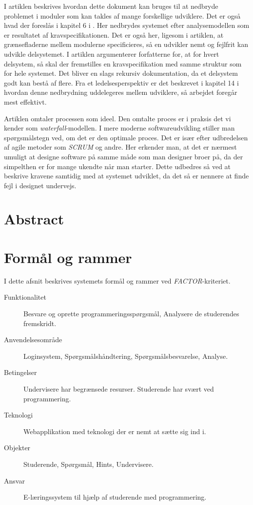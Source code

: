 \documentclass[12pt]{article}
\begin{document}
I artiklen beskrives hvordan dette dokument kan bruges til at nedbryde problemet i moduler som kan takles af mange forskellige udviklere. Det er også hvad der foreslås i kapitel 6 i \cite{OOSE}. Her nedbrydes systemet efter analysemodellen som er resultatet af kravspecifikationen. Det er også her, ligesom i artiklen, at grænsefladerne mellem modulerne specificieres, så en udvikler nemt og fejlfrit kan udvikle delsystemet. I artiklen argumenterer forfatterne for, at for hvert delsystem, så skal der fremstilles en kravspecifikation med samme struktur som for hele systemet. Det bliver en slags rekursiv dokumentation, da et delsystem godt kan bestå af flere. Fra et ledelsesperspektiv er det beskrevet i kapitel 14 i \cite{OOSE} hvordan denne nedbrydning uddelegeres mellem udviklere, så arbejdet foregår mest effektivt.

Artiklen omtaler processen som ideel. Den omtalte proces er i praksis det vi kender som \emph{waterfall}-modellen. I mere moderne softwareudvikling stiller man spørgsmålstegn ved, om det er den optimale proces. Det er især efter udbredelsen af agile metoder som \emph{SCRUM} \cite{sutherland2010jeff} og andre. Her erkender man, at det er nærmest umuligt at designe software på samme måde som man designer broer på, da der simpelthen er for mange ukendte når man starter. Dette udbedres så ved at beskrive kravene samtidig med at systemet udviklet, da det så er nennere at finde fejl i designet undervejs.
\section{Abstract}
\label{sec:abstract}

\section{Formål og rammer}
\label{sec:formal_og_rammer}
I dette afsnit beskrives systemets formål og rammer ved \textit{FACTOR}-kriteriet.
\begin{description}
    \item[Funktionalitet]
        Besvare og oprette programmeringsspørgsmål, Analysere de studerendes fremskridt.
    \item[Anvendelsesområde]
        Loginsystem, Spørgsmålshåndtering, Spørgsmålsbesvarelse, Analyse.
    \item[Betingelser]
        Undervisere har begrænsede resurser. Studerende har svært ved programmering.
    \item[Teknologi]
        Webapplikation med teknologi der er nemt at sætte sig ind i.
    \item[Objekter]
        Studerende, Spørgsmål, Hints, Undervisere.
    \item[Ansvar]
        E-læringssystem til hjælp af studerende med programmering.
\end{description}
\end{document}
